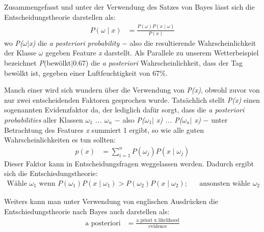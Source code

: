 \bigskip\noindent
Zusammengefasst und unter der Verwendung des Satzes von Bayes lässt sich die Entscheidungstheorie darstellen als:
\begin{align}
	P(\omega\mid x) &= \frac{P(\omega)P(x\mid \omega)}{P(x)}
\end{align}
wo \textit{P($\omega$$\mid$x)} die \textit{a posteriori probability} $-$ also die resultierende Wahrscheinlichkeit der Klasse $\omega$ gegeben Feature \textit{x} darstellt. Als Parallele zu unserem Wetterbeispiel bezeichnet \textit{P}(bewölkt$\mid$0.67) die \textit{a posteriori} Wahrscheinlichkeit, dass der Tag bewölkt ist, gegeben einer Luftfeuchtigkeit von 67\%.

Manch einer wird sich wundern über die Verwendung von \textit{P(x)}, obwohl zuvor von nur zwei entscheidenden Faktoren gesprochen wurde.
Tatsächlich stellt \textit{P(x)} einen sogenannten Evidenzfaktor da, der lediglich dafür sorgt, dass die \textit{a posteriori probabilities} aller Klassen \textit{$\omega_1$ ... $\omega_n$} $-$ also \textit{P($\omega_1$$\mid$ x) ... P($\omega_n$$\mid$ x)} $-$ unter Betrachtung des Features \textit{x} summiert 1 ergibt,
so wie alle guten Wahrscheinlichkeiten es tun sollten:
\begin{align*}
	p(x) &= \sum_{i=1}^n P(\omega_j)P(x\mid \omega_j)
\end{align*}
Dieser Faktor kann in Entscheidungsfragen weggelassen werden. Dadurch ergibt sich die Entschiedungstheorie:
\begin{align}
	\text{Wähle } \omega_1 \text{ wenn } P(\omega_1)P(x\mid\omega_1) > P(\omega_2)P(x\mid\omega_2); && \text{ansonsten wähle } \omega_2
\end{align}

Weiters kann man unter Verwendung von englischen Ausdrücken die Entschiedungstheorie nach Bayes auch darstellen als:
\begin{align}
	\text{a posteriori} &= \frac{\text{a priori x likelihood}}{\text{evidence}}
\end{align}

